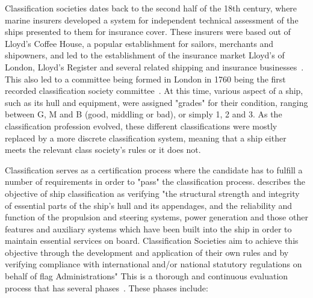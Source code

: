 Classification societies dates back to the second half of the 18th century, where marine insurers developed a system for independent technical assessment of the ships
presented to them for insurance cover. These insurers were based out of Lloyd's Coffee House, a popular establishment for sailors, merchants and shipowners, and led to
the establishment of the insurance market Lloyd's of London, Lloyd's Register and several related shipping and insurance businesses~\citep{Marcus1975}.
This also led to a committee being formed in London in 1760 being the first recorded classification society committee~\citep{Hormann2006}. 
At this time, various aspect of a ship, such as its hull and equipment, were assigned "grades" for their condition, ranging between G, M and B (good, middling or bad), 
or simply 1, 2 and 3. As the classification profession evolved, these different classifications were mostly replaced by a more discrete classification system, meaning
that a ship either meets the relevant class society's rules or it does not. 

Classification serves as a certification process where the candidate 
has to fulfill a number of requirements in order to "pass" the classification process. 
\citet{Hormann2006} describes the objective of ship classification as verifying "the structural strength and integrity of essential parts of the ship’s hull 
and its appendages, and the reliability and function of the propulsion and steering systems, power generation and those other features and auxiliary systems 
which have been built into the ship in order to maintain essential services on board. Classification Societies aim to achieve this objective through the development 
and application of their own rules and by verifying compliance with international and/or national statutory regulations on behalf of flag Administrations"
This is a thorough and continuous evaluation process that has several phases~\citep{Hormann2006}. These phases include:

